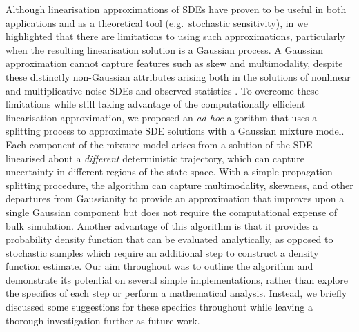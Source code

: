 Although linearisation approximations of SDEs have proven to be useful in both applications and as a theoretical tool (e.g.\ stochastic sensitivity), in  we highlighted that there are limitations to using such approximations, particularly when the resulting linearisation solution is a Gaussian process.
A Gaussian approximation cannot capture features such as skew and multimodality, despite these distinctly non-Gaussian attributes arising both in the solutions of nonlinear and multiplicative noise SDEs and observed statistics \citep{SuraEtAl_2005_MultiplicativeNoiseNonGaussianity,del-Castillo-Negrete_1998_AsymmetricTransportNonGaussian,BraccoEtAl_2000_VelocityProbabilityDensity}.
To overcome these limitations while still taking advantage of the computationally efficient linearisation approximation, we proposed an \emph{ad hoc} algorithm that uses a splitting process to approximate SDE solutions with a Gaussian mixture model.
Each component of the mixture model arises from a solution of the SDE linearised about a \emph{different} deterministic trajectory, which can capture uncertainty in different regions of the state space.
With a simple propagation-splitting procedure, the algorithm can capture multimodality, skewness, and other departures from Gaussianity to provide an approximation that improves upon a single Gaussian component but does not require the computational expense of bulk simulation.
Another advantage of this algorithm is that it provides a probability density function that can be evaluated analytically, as opposed to stochastic samples which require an additional step to construct a density function estimate.
Our aim throughout was to outline the algorithm and demonstrate its potential on several simple implementations, rather than explore the specifics of each step or perform a mathematical analysis.
Instead, we briefly discussed some suggestions for these specifics throughout  while leaving a thorough investigation further as future work.

